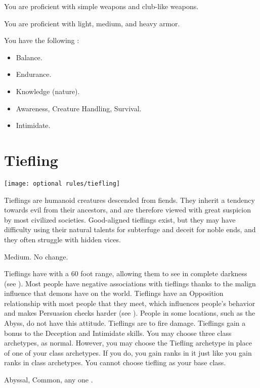 You are proficient with simple weapons and club-like weapons.

You are proficient with light, medium, and heavy armor.

You have the following :
\begin{itemize}
	\item {} Balance.
	\item {} Endurance.
	\item {} Knowledge (nature).
	\item {} Awareness, Creature Handling, Survival.
	\item {} Intimidate.
\end{itemize}

\section{Tiefling}
\texttt{[image: optional rules/tiefling]}

Tieflings are humanoid creatures descended from fiends.
They inherit a tendency towards evil from their ancestors, and are therefore viewed with great suspicion by most civilized societies.
Good-aligned tieflings exist, but they may have difficulty using their natural talents for subterfuge and deceit for noble ends, and they often struggle with hidden vices.

 Medium.
 No change.
\begin{itemize}
	 Tieflings have  with a 60 foot range, allowing them to see in complete darkness (see ).
	 Most people have negative associations with tieflings thanks to the malign influence that demons have on the world.
	      Tieflings have an Opposition relationship with most people that they meet, which influences people's behavior and makes Persuasion checks harder (see ).
	      People in some locations, such as the Abyss, do not have this attitude.
	 Tieflings are  to fire damage.
	 Tieflings gain a  bonus to the Deception and Intimidate skills.
	 You may choose three class archetypes, as normal.
	      However, you may choose the Tiefling archetype in place of one of your class archetypes.
	      If you do, you gain ranks in it just like you gain ranks in class archetypes.
	      You cannot choose tiefling as your base class.
\end{itemize}
 Abyssal, Common, any one .

